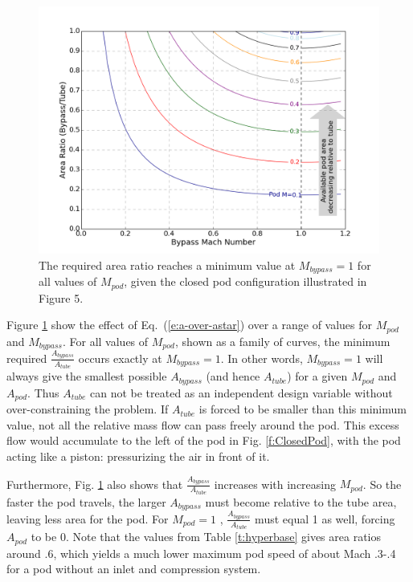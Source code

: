 \documentclass[heading.tex]{subfiles}
\begin{document}
\begin{figure}[!htb]
  \centering
  \includegraphics[width=.9\textwidth]{images/areaPlot.png}
  \caption{The required area ratio reaches a minimum value at $M_{bypass}=1$ for all values of $M_{pod}$, given the closed pod configuration illustrated in Figure 5.}
  \label{f:choked-flow}
\end{figure}

Figure \ref{f:choked-flow} show the effect of Eq.~(\ref{e:a-over-astar}) over a range of values for $M_{pod}$ and $M_{bypass}$. 
For all values of $M_{pod}$, shown as a family of curves, the minimum required $\frac{A_{bypass}}{A_{tube}}$ occurs exactly at $M_{bypass}=1$.
In other words, 
$M_{bypass}=1$ will always give the smallest possible $A_{bypass}$ (and hence $A_{tube}$) for a given 
$M_{pod}$ and $A_{pod}$. Thus $A_{tube}$ can not be treated as an independent design variable without over-constraining the problem.
If $A_{tube}$ is forced to be smaller than this minimum value, not all the relative mass flow can pass freely around the pod. This excess 
flow would accumulate to the left of the pod in Fig. \ref{f:ClosedPod},
with the pod acting like a piston: pressurizing the air in front of it. 

Furthermore, Fig. \ref{f:choked-flow} also shows that $\frac{A_{bypass}}{A_{tube}}$ 
increases with increasing $M_{pod}$. So the faster the pod travels, the larger $A_{bypass}$ 
must become relative to the tube area, leaving less area for the pod. For $M_{pod} = 1$ , $\frac{A_{bypass}}{A_{tube}}$ must 
equal 1 as well, forcing $A_{pod}$ to be 0. Note that the values from Table \ref{t:hyperbase} gives area ratios around .6, 
which yields a much lower maximum pod speed of about Mach .3-.4 for a pod without an inlet and compression system. 
\end{document}
